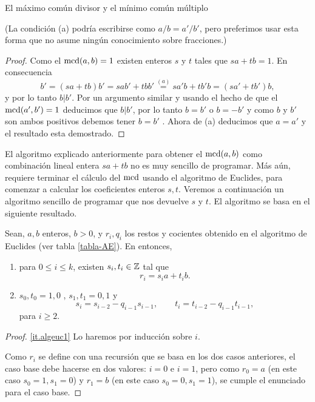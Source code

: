 \begin{section}{El máximo común divisor y el mínimo común múltiplo}
\begin{ejemplo*}
(La condición ({a}) podría escribirse como $a/b=a'/b'$, pero
preferimos usar esta forma que no asume ningún conocimiento sobre
fracciones.)
\end{ejemplo*}
\begin{proof} Como el $\operatorname{mcd} (a,b) =1$ existen enteros $s$ y $t$
tales que $sa+tb=1$. En consecuencia
$$
b'=(sa+tb)b' =sab'+tbb' \overset{(a)}{=} sa'b + tb'b = (sa'+tb')b,
$$
y por lo tanto $b|b'$. Por un argumento similar y usando el hecho
de que el $\operatorname{mcd}(a',b')=1 $ deducimos que $b|b'$, por lo tanto
$b=b'$ o $b=-b'$ y como $b $ y $b'$ son ambos positivos debemos
tener $b=b'$ . Ahora de (a) deducimos que $a=a'$ y el resultado
esta demostrado.
\end{proof}


\begin{observacion*}[*]
El  algoritmo explicado anteriormente para obtener el $\operatorname{mcd}(a,b)$ como combinación lineal entera $sa+tb$ no es muy sencillo de programar. Más aún, requiere terminar el cálculo del $\operatorname{mcd}$ usando el algoritmo de Euclides, para comenzar a calcular los coeficientes enteros $s,t$. Veremos a continuación un algoritmo sencillo de programar que nos devuelve $s$ y $t$. El algoritmo se basa en el siguiente resultado. 

\begin{proposicion}\label{prop-alg-euclides-2} Sean, $a,b$ enteros, $b>0$, y $r_i, q_i$ los restos y cocientes obtenido en el algoritmo de Euclides (ver tabla \ref{tabla-AE}). En entonces, 
\begin{enumerate}[label=\textit{\alph*)}]
    \item\label{it.algeuc1}     para $0 \le i \le k$,  existen $s_i, t_i \in {\mathbb Z}$ tal que
    \begin{equation*}
    r_i = s_ia + t_ib.
    \end{equation*}
    \item\label{it.algeuc2} $s_0, t_0 = 1, 0$ , $s_1, t_1 = 0, 1$ y 
    \begin{equation}
    s_{i} = s_{i-2} - q_{i-1}  s_{i-1}, \qquad t_{i} = t_{i-2} - q_{i-1}  t_{i-1},
    \end{equation}
    para $i \ge 2$.
\end{enumerate}
\end{proposicion}
\begin{proof}
    \ref{it.algeuc1} Lo haremos por inducción sobre $i$.
    
    Como $r_i$ se define con una recursión que se basa en los dos casos anteriores, el caso base debe hacerse en dos valores: $i=0$ e $i=1$, pero como  $r_0 = a$ (en este caso $s_0=1, s_1 =0$) y $r_1 =b$ (en este caso $s_0=0, s_1 =1$), se cumple el enunciado para el caso base. 
    

\end{proof}
\end{observacion*}
\end{section}
